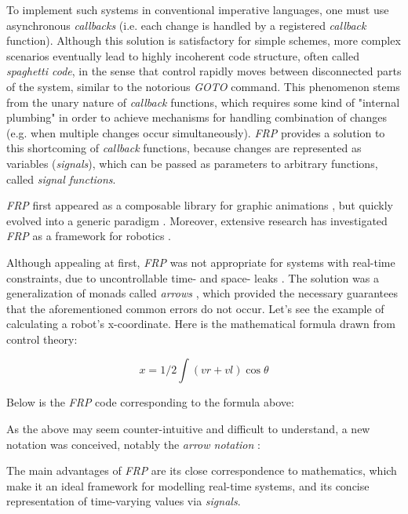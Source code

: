 \documentclass{dithesis}
\begin{document}
To implement such systems in conventional imperative languages, one must use asynchronous \textit{callbacks} (i.e. each change is handled by a registered \textit{callback} function). Although this solution is satisfactory for simple schemes, more complex scenarios eventually lead to highly incoherent code structure, often called \textit{spaghetti code}, in the sense that control rapidly moves between disconnected parts of the system, similar to the notorious \textit{GOTO} command. This phenomenon stems from the unary nature of \textit{callback} functions, which requires some kind of "internal plumbing" in order to achieve 	mechanisms for handling combination of changes (e.g. when multiple changes occur simultaneously). \textit{FRP} provides a solution to this shortcoming of \textit{callback} functions, because changes are represented as variables (\textit{signals}), which can be passed as parameters to arbitrary functions, called \textit{signal functions}.

\textit{FRP} first appeared as a composable library for graphic animations \cite{fran}, but quickly evolved into a generic paradigm \cite{survey_frp,real_frp,pushpull_frp}. Moreover, extensive research has investigated \textit{FRP} as a framework for robotics \cite{arrows_robots,lambda_in_motion}. 

Although appealing at first, \textit{FRP} was not appropriate for systems  with real-time constraints, due to uncontrollable time- and space- leaks \cite{event_frp}. The solution was a generalization of monads called \textit{arrows} \cite{arrows}, which provided the necessary guarantees that the aforementioned common errors do not occur. Let's see the example of calculating a robot's x-coordinate. Here is the mathematical formula drawn from control theory:

$$ x = 1/2 \int (vr + vl) \cos\theta $$ 

Below is the \textit{FRP} code corresponding to the formula above:


As the above may seem counter-intuitive and difficult to understand, a new notation was conceived, notably the \textit{arrow notation} \cite{arrows_notation}:


The main advantages of \textit{FRP} are its close correspondence to mathematics\cite{survey_frp}, which make it an ideal framework for modelling real-time systems, and its concise representation of time-varying values via \textit{signals}.
\end{document}
